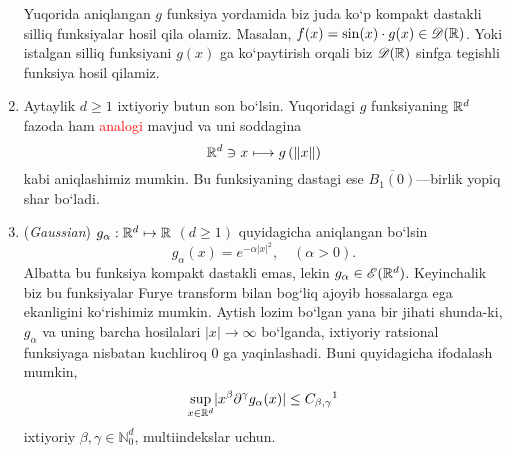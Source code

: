 \begin{example}
\begin{enumerate}
\begin{minipage}{0.9\textwidth}
\begin{minipage}[b]{0.45\textwidth}
\begin{figure}[H]
        \end{figure}
    \end{minipage}
    \end{minipage}
\break
Yuqorida aniqlangan $g$ funksiya yordamida biz juda ko`p kompakt dastakli sil\-liq funksiyalar hosil qila olamiz. Masalan, $f(x)=\sin(x)\cdot g(x)\in\mathscr{D}(\mathbb{R})$. Yoki istalgan silliq funksiyani $g(x)$ ga ko`paytirish orqali biz $\mathscr{D}(\mathbb{R})$ sinfga tegishli funksiya hosil qilamiz.

\item Aytaylik $d\ge 1$ ixtiyoriy butun son bo`lsin. Yuqoridagi $g$ funksiyaning ${\mathbb{R}^{d}}$ fazoda ham \textcolor{red}{analogi} mavjud va uni soddagina 
\begin{equation*}
    {\mathbb{R}^{d}} \ni x\longmapsto g\left(\lVert x\rVert\right)
\end{equation*}
kabi aniqlashimiz mumkin. Bu funksiyaning dastagi ese $\overline{B_1(0)}$---birlik yopiq shar bo`ladi.

\item (\emph{Gaussian}) $g_\alpha : {\mathbb{R}^{d}} \mapsto \mathbb{R}$ $(d\ge1)$ quyidagicha aniqlangan bo`lsin 
\begin{equation*}
    g_\alpha(x)=e^{-\alpha \lvert x\rvert^2}, \quad (\alpha>0).
\end{equation*}
Albatta bu funksiya kompakt dastakli emas, lekin $g_\alpha \in\mathscr{E}({\mathbb{R}^{d}})$. Keyinchalik biz bu funksiyalar Furye transform bilan bog`liq ajoyib hossalarga ega ekanligini ko`\-ri\-shi\-miz mumkin. Aytish lozim bo`lgan yana bir jihati shunda-ki, $g_\alpha$ va uning barcha hosilalari $\lvert x\rvert \to \infty$  bo`lganda, ixtiyoriy ratsional funksiyaga nisbatan kuchliroq $0$ ga yaqinlashadi. Buni quyidagicha ifodalash mumkin,
\begin{equation*}
    \sup\limits_{x\in\rd} \lvert x^\beta \partial^\gamma g_\alpha(x)\rvert \le C_{\beta,\gamma} \footnotemark
\end{equation*}
ixtiyoriy $\beta, \gamma\in \mathbb{N}_0^d$, multiindekslar uchun. 
\end{enumerate}
\end{example}

 